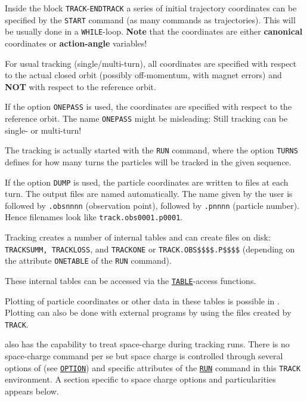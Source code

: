 Inside the block \texttt{TRACK}-\texttt{ENDTRACK} a series 
of initial trajectory coordinates can be specified by the \texttt{START} 
command (as many commands as trajectories). This will be usually done in a 
\texttt{WHILE}-loop. \textbf{Note} that the coordinates are either 
\textbf{canonical} coordinates or \textbf{action-angle} variables!

For usual tracking (single/multi-turn), all coordinates are specified
with respect to the actual closed orbit (possibly off-momentum, with
magnet errors) and \textbf{NOT} with respect to the reference orbit. 

If the option \texttt{ONEPASS} is used, the coordinates are specified
with respect to the reference orbit. The name \texttt{ONEPASS} might be
misleading: Still tracking can be single- or multi-turn!   

The tracking is actually started with the \texttt{RUN} command, where
the option \texttt{TURNS} defines for how many turns the particles will
be tracked in the given sequence. 

If the option \texttt{DUMP} is used, the particle coordinates are
written to files at each turn. The output files are named
automatically. The name given by the user is followed by
\texttt{.obsnnnn} (observation point), followed by
\texttt{.pnnnn} (particle number).\\
Hence filenames look like \texttt{track.obs0001.p0001}.  

Tracking creates a number of internal tables and can create files on disk: 
\texttt{TRACKSUMM, TRACKLOSS}, and \texttt{TRACKONE} or
\texttt{TRACK.OBS\$\$\$\$.P\$\$\$\$} (depending on the attribute
\texttt{ONETABLE} of the \texttt{RUN} command).

These internal tables can be accessed via the
\hyperref[chap:tables]{\texttt{TABLE}}-access functions.

Plotting of particle coordinates or other data in these tables is
possible in \madx. Plotting can also be done with external programs by
using the files created by \texttt{TRACK}.  

\madx also has the capability to treat space-charge during tracking
runs. There is no space-charge command per se but space charge is
controlled through several options of \madx (see
\hyperref[sec:option]{\texttt{OPTION}}) and specific attributes of the
\hyperref[sec:run]{\texttt{RUN}} command in this \texttt{TRACK} environment. A
section specific to space charge options and particularities appears
below.



